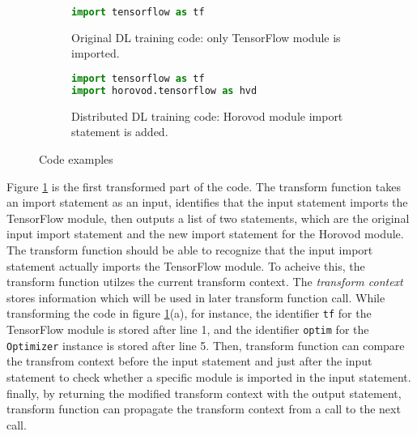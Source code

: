 \begin{figure}[ht!]
  \centering

  \begin{subfigure}[t]{0.48\textwidth}
    \begin{lstlisting}[language=Python]
import tensorflow as tf
    \end{lstlisting}
    \caption{Original DL training code: only TensorFlow module is imported.}
  \end{subfigure}
  \hspace{5mm}
  \begin{subfigure}[t]{0.48\textwidth}
    \begin{lstlisting}[language=Python]
import tensorflow as tf
import horovod.tensorflow as hvd
    \end{lstlisting}
    \caption{Distributed DL training code: Horovod module import statement is added.}
  \end{subfigure}
  \caption{Code examples}
  \label{fig:trans:ex01}
\end{figure}

Figure \ref{fig:trans:ex01} is the first transformed part of the code.
The transform function takes an import statement as an input,
identifies that the input statement imports the TensorFlow module,
then outputs a list of two statements, which are the original input 
import statement and the new import statement for the Horovod module. 
The transform function should be able to recognize that the input import
statement actually imports the TensorFlow module.
To acheive this, the transform function utilzes the current transform context.
The \textit{transform context} stores information 
which will be used in later transform function call.  
While transforming the code in figure \ref{fig:trans:ex01}(a),
for instance, the identifier {\tt tf} for the TensorFlow
module is stored after line 1, and the identifier {\tt optim}
for the {\tt Optimizer} instance is stored after line 5.
Then, transform function can compare the transfrom context before the input statement
and just after the input statement to check whether a specific module
is imported in the input statement.
finally, by returning the modified transform context with the output statement,
transform function can propagate the transform context from a call
to the next call.

